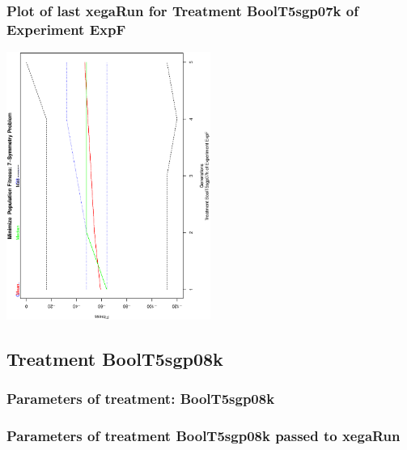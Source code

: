 \documentclass[18pt,c]{beamer}
\makeatletter
\def\beamer@writeslidentry@miniframesoff{%
  \expandafter\beamer@ifempty\expandafter{\beamer@framestartpage}{}%
  {%
   \clearpage\beamer@notesactions%
  }
}
\newcommand*{\miniframesoff}{\let\beamer@writeslidentry=\beamer@writeslidentry@miniframesoff}
\makeatother
\begin{document}
 \begin{frame}
 \frametitle{ Plot of last xegaRun for Treatment BoolT5sgp07k of Experiment ExpF }
 \begin{center}
\includegraphics[width=0.5\textwidth, angle=-90]
{ExpFPlotPopStatsFigure005.eps}
 \end{center}
 \label{report/ExpFPlotPopStatsFigure005.eps}  
 \end{frame}

\miniframesoff
\subsection{Treatment BoolT5sgp08k}

 \begin{frame}
 \fontsize{8pt}{9pt}\selectfont
 \frametitle{  Parameters of treatment: BoolT5sgp08k 
 }

 \label{ExpFtParmTable024.tex}  
 \end{frame}


 \begin{frame}
 \fontsize{8pt}{9pt}\selectfont
 \frametitle{  Parameters of treatment BoolT5sgp08k passed to xegaRun
 }

 \label{ExpFtParmTable025.tex}  
 \end{frame}
\end{document}

